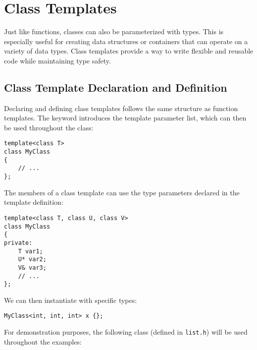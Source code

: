 \documentclass[12pt]{article}
\begin{document}
\section{Class Templates}

\noindent
Just like functions, classes can also be parameterized with types.
This is especially useful for creating data structures or containers that can operate on a variety of data types.
Class templates provide a way to write flexible and reusable code while maintaining type safety.

\subsection{Class Template Declaration and Definition}

\noindent
Declaring and defining class templates follows the same structure as function templates.
The  keyword introduces the template parameter list, which can then be used throughout the class:

\begin{lstlisting}[style=cxx]
template<class T>
class MyClass
{
    // ...
};
\end{lstlisting}

\noindent
The members of a class template can use the type parameters declared in the template definition:

\begin{lstlisting}[style=cxx]
template<class T, class U, class V>
class MyClass
{
private:
    T var1;
    U* var2;
    V& var3;
    // ...
};
\end{lstlisting}

\noindent
We can then instantiate  with specific types:

\begin{lstlisting}[style=cxx]
MyClass<int, int, int> x {};
\end{lstlisting}

\noindent
For demonstration purposes, the following  class (defined in \texttt{list.h}) will be used throughout the examples:
\end{document}
